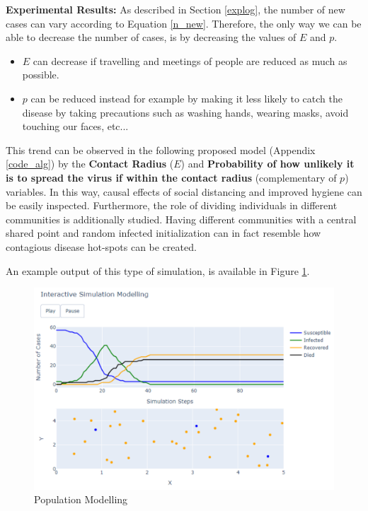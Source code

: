 \textbf{Experimental Results:} As described in Section \ref{explog}, the number of new cases can vary according to Equation \ref{n_new}. Therefore, the only way we can be able to decrease the number of cases, is by decreasing the values of $E$ and $p$. 
\begin{itemize}
    \setlength\itemsep{-0.3cm}
    \item $E$ can decrease if travelling and meetings of people are reduced as much as possible.
    \item $p$ can be reduced instead for example by making it less likely to catch the disease by taking precautions such as washing hands, wearing masks, avoid touching our faces, etc...
\end{itemize}

This trend can be observed in the following proposed model (Appendix \ref{code_alg}) by the \textbf{Contact Radius} ($E$) and \textbf{Probability of how unlikely it is to spread the virus if within the contact radius} (complementary of $p$) variables.
In this way, causal effects of social distancing and improved hygiene can be easily inspected. Furthermore, the role of dividing individuals in different communities is additionally studied. Having different communities with a central shared point and random infected initialization can in fact resemble how contagious disease hot-spots can be created.

An example output of this type of simulation, is available in Figure \ref{pop}.

\begin{figure}[ht!]%
    \centering
    \includegraphics[width=0.85\linewidth]{latex/images/pop.pdf}
    \caption{Population Modelling}
    \label{pop}
\end{figure}

